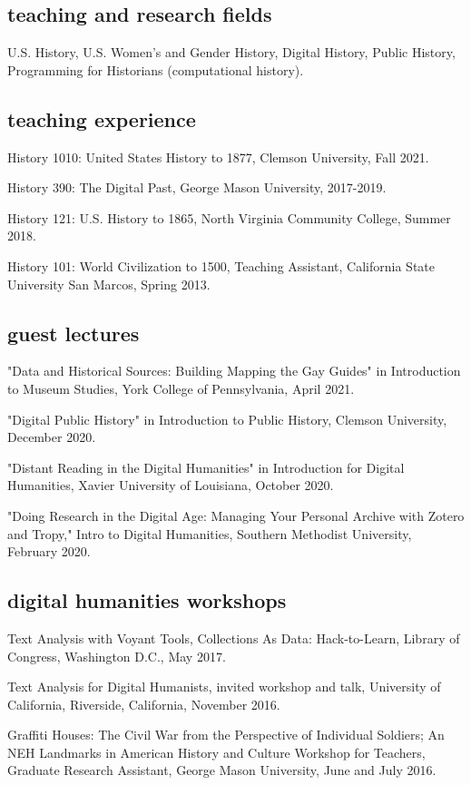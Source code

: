 \documentclass[11pt]{article}
\begin{document}
\subsection{teaching and research fields}
U.S. History, U.S. Women's and Gender History, Digital History, Public History, Programming for Historians (computational history).

\subsection{teaching experience}
History 1010: United States History to 1877, Clemson University, Fall 2021.

History 390: The Digital Past, George Mason University, 2017-2019.

History 121: U.S. History to 1865, North Virginia Community College, Summer 2018.

History 101: World Civilization to 1500, Teaching Assistant, California State University San Marcos, Spring 2013.

\subsection{guest lectures}
"Data and Historical Sources: Building Mapping the Gay Guides" in Introduction to Museum Studies, York College of Pennsylvania, April 2021.

"Digital Public History" in Introduction to Public History, Clemson University, December 2020.

"Distant Reading in the Digital Humanities" in Introduction for Digital Humanities, Xavier University of Louisiana, October 2020.

"Doing Research in the Digital Age: Managing Your Personal Archive with Zotero and Tropy," Intro to Digital Humanities, Southern Methodist University, February 2020.

\subsection{digital humanities workshops}
Text Analysis with Voyant Tools, Collections As Data: Hack-to-Learn, Library of Congress, Washington D.C., May 2017.

Text Analysis for Digital Humanists, invited workshop and talk, University of California, Riverside, California, November 2016.

Graffiti Houses: The Civil War from the Perspective of Individual Soldiers; An NEH Landmarks in American History and Culture Workshop for Teachers, Graduate Research Assistant, George Mason University, June and July 2016.
\end{document}
